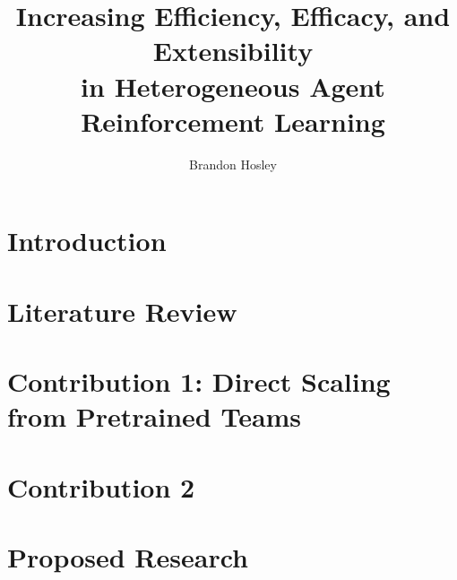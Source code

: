 \documentclass{afitthesis}
\title{%
    Increasing Efficiency, Efficacy, and Extensibility\\
    in Heterogeneous Agent Reinforcement Learning }
\author{Brandon Hosley}
\begin{document}
\maketitle %

\chapter{Introduction}%


\chapter{Literature Review}%
\label{ch:literature_review}


\chapter{Contribution 1: Direct Scaling from Pretrained Teams}
\label{ch:contribution_1}


\chapter{Contribution 2}
\label{ch:contribution_2}


\label{ch:contribution_3}
% 

\chapter{Proposed Research}%
\label{ch:methodology}


%

%
\end{document}
